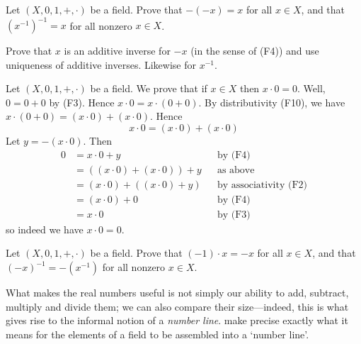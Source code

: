 \begin{exercise}
\label{exInverseIsInvolution}
Let $(X, 0, 1, +, {\cdot})$ be a field. Prove that $-(-x)=x$ for all $x \in X$, and that $(x^{-1})^{-1} = x$ for all nonzero $x \in X$.
\begin{backhint}
Prove that $x$ is an additive inverse for $-x$ (in the sense of (F4)) and use uniqueness of additive inverses. Likewise for $x^{-1}$.
\end{backhint}
\end{exercise}

\begin{example}
Let $(X,0,1,+,{\cdot})$ be a field. We prove that if $x \in X$ then $x \cdot 0 = 0$. Well, $0=0+0$ by (F3). Hence $x \cdot 0 = x \cdot (0+0)$. By distributivity (F10), we have $x \cdot (0+0) = (x \cdot 0) + (x \cdot 0)$. Hence
\[ x \cdot 0 = (x \cdot 0) + (x \cdot 0) \]
Let $y=-(x \cdot 0)$. Then
\begin{align*}
0 &= x \cdot 0 + y && \text{by (F4)} \\
&= ((x \cdot 0) + (x \cdot 0)) + y && \text{as above} \\
&= (x \cdot 0) + ((x \cdot 0) + y) && \text{by associativity (F2)} \\
&= (x \cdot 0) + 0 && \text{by (F4)} \\
&= x \cdot 0 && \text{by (F3)}
\end{align*}
so indeed we have $x \cdot 0 = 0$.
\end{example}

\begin{exercise}
\label{exMinusOneSquaredIsOne}
Let $(X,0,1,+,{\cdot})$ be a field. Prove that $(-1) \cdot x = -x$ for all $x \in X$, and that $(-x)^{-1} = -(x^{-1})$ for all nonzero $x \in X$.
\end{exercise}

What makes the real numbers useful is not simply our ability to add, subtract, multiply and divide them; we can also compare their size---indeed, this is what gives rise to the informal notion of a \textit{number line}.  make precise exactly what it means for the elements of a field to be assembled into a `number line'.

